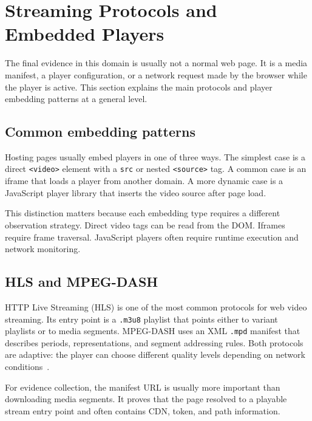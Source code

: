\section{Streaming Protocols and Embedded Players}

The final evidence in this domain is usually not a normal web page. It is a media
manifest, a player configuration, or a network request made by the browser while the
player is active. This section explains the main protocols and player embedding
patterns at a general level.

\subsection{Common embedding patterns}

Hosting pages usually embed players in one of three ways. The simplest case is a direct
\texttt{<video>} element with a \texttt{src} or nested \texttt{<source>} tag. A common
case is an iframe that loads a player from another domain. A more dynamic case is a
JavaScript player library that inserts the video source after page load.



This distinction matters because each embedding type requires a different observation
strategy. Direct video tags can be read from the DOM\@. Iframes require frame traversal.
JavaScript players often require runtime execution and network monitoring.

\subsection{HLS and MPEG-DASH}

HTTP Live Streaming (HLS) is one of the most common protocols for web video streaming.
Its entry point is a \texttt{.m3u8} playlist that points either to variant playlists or
to media segments. MPEG-DASH uses an XML \texttt{.mpd} manifest that describes periods,
representations, and segment addressing rules. Both protocols are adaptive: the player
can choose different quality levels depending on network conditions~\cite{hls-rfc,dash-standard}.



For evidence collection, the manifest URL is usually more important than downloading
media segments. It proves that the page resolved to a playable stream entry point and
often contains CDN, token, and path information.

